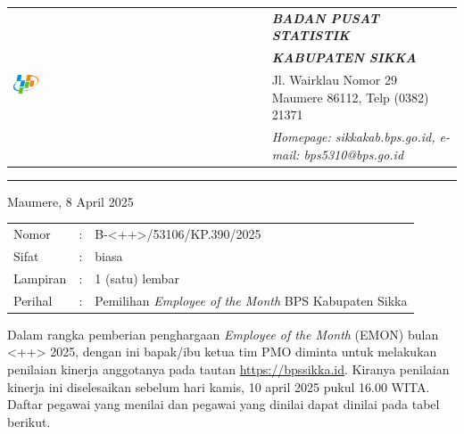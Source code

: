 \documentclass{article}
\begin{document}




\begin{tabular}{ll}
   \multirow{4}{*}{\includegraphics[width=0.10\textwidth]{logo/bps-logo.png}} %
   &
   \large{\textbf{\textit{BADAN PUSAT STATISTIK}}} \\
   & \large{\textbf{\textit{KABUPATEN SIKKA}}} \\
   & Jl. Wairklau Nomor 29 Maumere 86112, Telp (0382) 21371 \\
   & \textit{Homepage: sikkakab.bps.go.id, e-mail: bps5310@bps.go.id} \\
\end{tabular}

\hfill

\vspace{-1em} %

\rule{\linewidth}{1pt} %


\hfill
Maumere, 8 April 2025

\begin{tabular}{@{} lcl}
	Nomor&:&B-<++>/53106/KP.390/2025 \\
	Sifat&:&biasa \\
	Lampiran&:&1 (satu) lembar\\
    Perihal&:& Pemilihan \textit{Employee of the Month} BPS Kabupaten Sikka\\
\end{tabular}

\bigskip %

Dalam rangka pemberian penghargaan \textit{Employee of the Month} (EMON) bulan <++> 2025, dengan ini bapak/ibu ketua tim PMO diminta untuk melakukan penilaian kinerja anggotanya pada tautan \href{https://bpssikka.id/}{https://bpssikka.id}.
Kiranya penilaian kinerja ini diselesaikan sebelum hari kamis, 10 april 2025 pukul 16.00 WITA.
Daftar pegawai yang menilai dan pegawai yang dinilai dapat dinilai pada tabel berikut.
\end{document}
